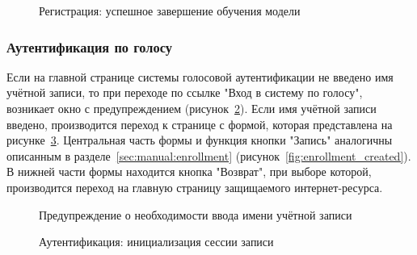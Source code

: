 \begin{figure}[hbt!]
\caption{Регистрация: успешное завершение обучения модели}
\label{fig:enrollment_success}
\end{figure}

\subsubsection{Аутентификация по голосу}
\label{sec:manual:verification}


Если на главной странице системы голосовой аутентификации не введено имя учётной записи, то при переходе по  ссылке "Вход в систему по голосу", возникает окно с предупреждением (рисунок~\ref{fig:warning_need_login}). Если имя учётной записи введено, производится переход к странице с формой, которая представлена на рисунке~\ref{fig:verification_created}. Центральная часть формы и функция кнопки "Запись" аналогичны описанным в разделе~\ref{sec:manual:enrollment} (рисунок~\ref{fig:enrollment_created}). В нижней части формы находится кнопка "Возврат", при выборе которой, производится переход на главную страницу защищаемого интернет-ресурса.


\begin{figure}[hbt!]
\caption{Предупреждение о необходимости ввода имени учётной записи}
\label{fig:warning_need_login}
\end{figure}


\begin{figure}[hbt!]
\caption{Аутентификация: инициализация сессии записи}
\label{fig:verification_created}
\end{figure}

